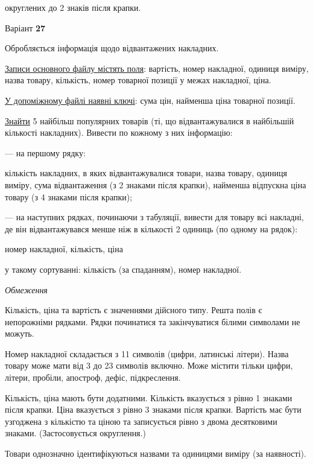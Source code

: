 \documentclass[11pt, ukrainian]{article}
\begin{document}
\bigskip
{\noindent} округлених до 2 знаків після крапки.


\par
\newpage
{\center Варіант  \No \textbf { 27 }\par}
\bigskip
Обробляється інформація щодо відвантажених накладних.

\underline{Записи основного файлу містять поля}: вартість, номер накладної, одиниця виміру, назва товару, кількість, номер товарної позиції у межах накладної, ціна.

\underline{У допоміжному файлі наявні ключі}: сума цін, найменша ціна товарної позиції.

\underline{Знайти} 5 найбільш популярних товарів (ті, що відвантажувалися в найбільшій кількості накладних). Вивести по кожному з них інформацію:\par
{\noindent}--- на першому рядку:\par
кількість накладних, в яких відвантажувалися товари, назва товару, одиниця виміру, сума відвантаження (з 2 знаками після крапки), найменша відпускна ціна товару (з 4 знаками після крапки);

{\noindent}--- на наступних рядках, починаючи з табуляції, вивести для товару всі накладні, де він відвантажувався менше ніж в кількості 2 одиниць (по одному на рядок):\par
номер накладної, кількість, ціна

{\noindent}у такому сортуванні: кількість (за спаданням), номер накладної.


\bigskip\textit{Обмеження}

Кількість, ціна та вартість є значеннями дійсного типу.
Решта полів є непорожніми рядками.
Рядки починатися та закінчуватися білими символами не можуть.

Номер накладної складається з 11 символів (цифри, латинські літери).
Назва товару може мати від 3 до 23 символів включно.
Може містити тільки цифри, літери, пробіли, апостроф, дефіс, підкреслення.

Кількість, ціна мають бути додатними.
Кількість вказується з рівно 1 знаками після крапки.
Ціна вказується з рівно 3 знаками після крапки.
Вартість має бути узгоджена з кількістю та ціною та записується рівно з двома десятковими знаками.
(Застосовується округлення.)

Товари однозначно ідентифікуються назвами та одиницями виміру (за наявності).
\end{document}
